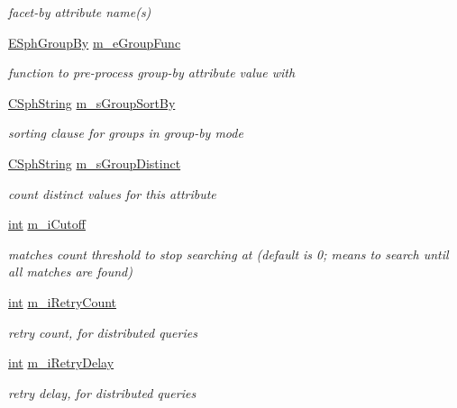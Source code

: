 \begin{DoxyCompactItemize}
\begin{DoxyCompactList}\small\item\em facet-\/by attribute name(s) \end{DoxyCompactList}\item 
\hyperlink{sphinx_8h_a54472d41a76434c6d6535d438bc080bf}{E\-Sph\-Group\-By} \hyperlink{classCSphQuery_ae921237bec923323f4462c09508d05d3}{m\-\_\-e\-Group\-Func}
\begin{DoxyCompactList}\small\item\em function to pre-\/process group-\/by attribute value with \end{DoxyCompactList}\item 
\hyperlink{structCSphString}{C\-Sph\-String} \hyperlink{classCSphQuery_ab15fa0d113e9aa216ffeb96a8d89ce2f}{m\-\_\-s\-Group\-Sort\-By}
\begin{DoxyCompactList}\small\item\em sorting clause for groups in group-\/by mode \end{DoxyCompactList}\item 
\hyperlink{structCSphString}{C\-Sph\-String} \hyperlink{classCSphQuery_ac3cb46ce8599772486bbc7a49aac0fb3}{m\-\_\-s\-Group\-Distinct}
\begin{DoxyCompactList}\small\item\em count distinct values for this attribute \end{DoxyCompactList}\item 
\hyperlink{sphinxexpr_8cpp_a4a26e8f9cb8b736e0c4cbf4d16de985e}{int} \hyperlink{classCSphQuery_a8ce53c13bb1c039139f86e5726bc0f9b}{m\-\_\-i\-Cutoff}
\begin{DoxyCompactList}\small\item\em matches count threshold to stop searching at (default is 0; means to search until all matches are found) \end{DoxyCompactList}\item 
\hyperlink{sphinxexpr_8cpp_a4a26e8f9cb8b736e0c4cbf4d16de985e}{int} \hyperlink{classCSphQuery_afe77175090de03ece5fcfe69053aed07}{m\-\_\-i\-Retry\-Count}
\begin{DoxyCompactList}\small\item\em retry count, for distributed queries \end{DoxyCompactList}\item 
\hyperlink{sphinxexpr_8cpp_a4a26e8f9cb8b736e0c4cbf4d16de985e}{int} \hyperlink{classCSphQuery_adb2b972d9fc1a92333e878625c9fc6c7}{m\-\_\-i\-Retry\-Delay}
\begin{DoxyCompactList}\small\item\em retry delay, for distributed queries \end{DoxyCompactList}\item 

\end{DoxyCompactItemize}
